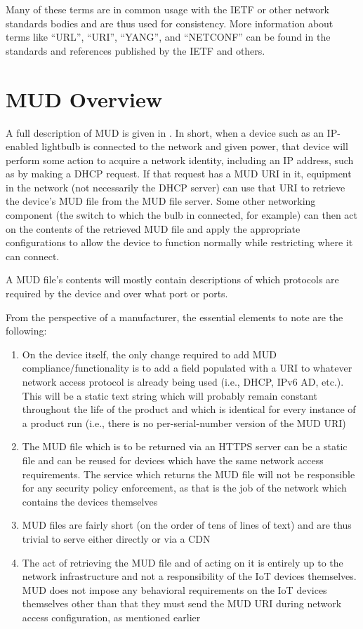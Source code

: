 \documentclass[conference]{IEEEtran}
\begin{document}
Many of these terms are in common usage with the IETF or other network
standards bodies and are thus used for consistency.  More information
about terms like ``URL'', ``URI'', ``YANG'', and ``NETCONF'' can be
found in the standards and references published by the IETF and others.

\section{MUD Overview}
A full description of MUD is given in \cite{I-D:ietf-opsawg-mud}.  In
short, when a device such as an IP-enabled lightbulb is connected to
the network and given power, that device will perform some action to
acquire a network identity, including an IP address, such as by making
a DHCP request.  If that request has a MUD URI in it, equipment in the
network (not necessarily the DHCP server) can use that URI to retrieve
the device's MUD file from the MUD file server.  Some other networking
component (the switch to which the bulb in connected, for example) can
then act on the contents of the retrieved MUD file and apply the
appropriate configurations to allow the device to function normally
while restricting where it can connect.

A MUD file's contents will mostly contain descriptions of which
protocols are required by the device and over what port or ports.

From the perspective of a manufacturer, the essential elements to note
are the following:
\begin{enumerate}
\item On the device itself, the only change required to add MUD
  compliance/functionality is to add a field populated with a URI to
  whatever network access protocol is already being used (i.e., DHCP,
  IPv6 AD, etc.).  This will be a static text string which will
  probably remain constant throughout the life of the product and
  which is identical for every instance of a product run (i.e., there
  is no per-serial-number version of the MUD URI)
\item The MUD file which is to be returned via an HTTPS server can be
  a static file and can be reused for devices which have the same
  network access requirements.  The service which returns the MUD file
  will not be responsible for any security policy enforcement, as that
  is the job of the network which contains the devices themselves
\item MUD files are fairly short (on the order of tens of lines of
  text) and are thus trivial to serve either directly or via a CDN
\item The act of retrieving the MUD file and of acting on it is
  entirely up to the network infrastructure and not a responsibility
  of the IoT devices themselves.  MUD does not impose any behavioral
  requirements on the IoT devices themselves other than that they must
  send the MUD URI during network access configuration, as mentioned
  earlier
\end{enumerate}
\end{document}
